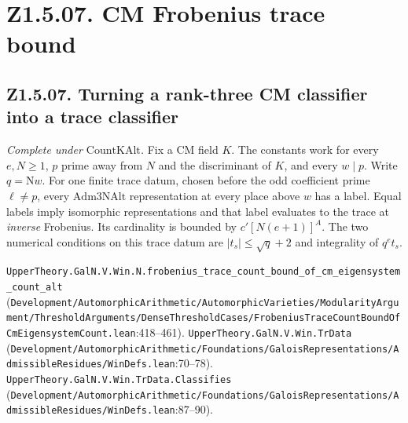 \section*{Z1.5.07. CM Frobenius trace bound}

\subsection{Z1.5.07. Turning a rank-three CM classifier into a trace classifier}
\label{r5:small:Z1.5.07}
\textit{Complete under $\mathrm{CountKAlt}$.} Fix a CM field $K$. The constants work for every $e,N\ge1$, $p$ prime away from $N$ and the discriminant of $K$, and every $w\mid p$. Write $q=\mathrm{N}w$. For one finite trace datum, chosen before the odd coefficient prime $\ell\ne p$, every $\mathrm{Adm3NAlt}$ representation at every place above $w$ has a label. Equal labels imply isomorphic representations and that label evaluates to the trace at \emph{inverse} Frobenius. Its cardinality is bounded by $c'[N(e+1)]^A$. The two numerical conditions on this trace datum are $|t_s|\le\sqrt q+2$ and integrality of $q^e t_s$.
\par{\footnotesize \nolinkurl{UpperTheory.GalN.V.Win.N.frobenius_trace_count_bound_of_cm_eigensystem_count_alt} (\nolinkurl{Development/AutomorphicArithmetic/AutomorphicVarieties/ModularityArgument/ThresholdArguments/DenseThresholdCases/FrobeniusTraceCountBoundOfCmEigensystemCount.lean}\allowbreak:418--461). \nolinkurl{UpperTheory.GalN.V.Win.TrData} (\nolinkurl{Development/AutomorphicArithmetic/Foundations/GaloisRepresentations/AdmissibleResidues/WinDefs.lean}\allowbreak:70--78). \nolinkurl{UpperTheory.GalN.V.Win.TrData.Classifies} (\nolinkurl{Development/AutomorphicArithmetic/Foundations/GaloisRepresentations/AdmissibleResidues/WinDefs.lean}\allowbreak:87--90).\par}

